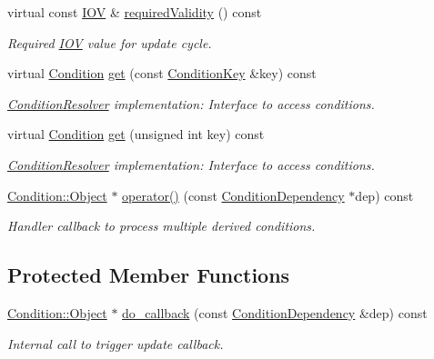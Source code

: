 \begin{DoxyCompactItemize}
virtual const \hyperlink{class_d_d4hep_1_1_i_o_v}{I\+OV} \& \hyperlink{class_d_d4hep_1_1_conditions_1_1_conditions_dependency_handler_a65870f83dc56b87f3f2056b37ed85e2f}{required\+Validity} () const
\begin{DoxyCompactList}\small\item\em Required \hyperlink{class_d_d4hep_1_1_i_o_v}{I\+OV} value for update cycle. \end{DoxyCompactList}\item 
virtual \hyperlink{class_d_d4hep_1_1_conditions_1_1_condition}{Condition} \hyperlink{class_d_d4hep_1_1_conditions_1_1_conditions_dependency_handler_aad2210814936ed6c04fe86b760cfb402}{get} (const \hyperlink{class_d_d4hep_1_1_conditions_1_1_condition_key}{Condition\+Key} \&key) const
\begin{DoxyCompactList}\small\item\em \hyperlink{class_d_d4hep_1_1_conditions_1_1_condition_resolver}{Condition\+Resolver} implementation\+: Interface to access conditions. \end{DoxyCompactList}\item 
virtual \hyperlink{class_d_d4hep_1_1_conditions_1_1_condition}{Condition} \hyperlink{class_d_d4hep_1_1_conditions_1_1_conditions_dependency_handler_a05c865a8a52716dfabf10101e849182b}{get} (unsigned int key) const
\begin{DoxyCompactList}\small\item\em \hyperlink{class_d_d4hep_1_1_conditions_1_1_condition_resolver}{Condition\+Resolver} implementation\+: Interface to access conditions. \end{DoxyCompactList}\item 
\hyperlink{class_d_d4hep_1_1_conditions_1_1_condition_a6fc8dae0dad41db6a237920c85f8a55d}{Condition\+::\+Object} $\ast$ \hyperlink{class_d_d4hep_1_1_conditions_1_1_conditions_dependency_handler_ad4230e80365f9fbd75077ca3bf0be23c}{operator()} (const \hyperlink{class_d_d4hep_1_1_conditions_1_1_condition_dependency}{Condition\+Dependency} $\ast$dep) const
\begin{DoxyCompactList}\small\item\em Handler callback to process multiple derived conditions. \end{DoxyCompactList}\end{DoxyCompactItemize}
\subsection*{Protected Member Functions}
\begin{DoxyCompactItemize}
\item 
\hyperlink{class_d_d4hep_1_1_conditions_1_1_condition_a6fc8dae0dad41db6a237920c85f8a55d}{Condition\+::\+Object} $\ast$ \hyperlink{class_d_d4hep_1_1_conditions_1_1_conditions_dependency_handler_a62fd1c8dd9f47cd555f8d96f78b6e1c5}{do\+\_\+callback} (const \hyperlink{class_d_d4hep_1_1_conditions_1_1_condition_dependency}{Condition\+Dependency} \&dep) const
\begin{DoxyCompactList}\small\item\em Internal call to trigger update callback. \end{DoxyCompactList}\end{DoxyCompactItemize}
